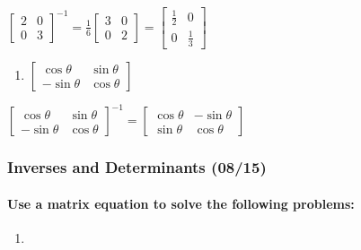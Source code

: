 \documentclass[
  letterpaper,
  DIV=11,
  numbers=noendperiod]{scrartcl}
\let\oldparagraph\paragraph
\renewcommand{\paragraph}[1]{\oldparagraph{#1}\mbox{}}
\providecommand{\tightlist}{%
  \setlength{\itemsep}{0pt}\setlength{\parskip}{0pt}}\usepackage{longtable,booktabs,array}
\begin{document}
\(\begin{bmatrix}2 & 0 \\ 0 & 3 \end{bmatrix}^{-1} = \frac{1}{6}\begin{bmatrix}3 & 0 \\ 0 & 2 \end{bmatrix}=\begin{bmatrix}\frac{1}{2} & 0 \\ 0 & \frac{1}{3}\end{bmatrix}\)

\begin{enumerate}
\def\labelenumi{\arabic{enumi})}
\setcounter{enumi}{2}
\tightlist
\item
  \(\begin{bmatrix}\cos\theta & \sin\theta \\ -\sin\theta & \cos\theta \end{bmatrix}\)
\end{enumerate}

\(\begin{bmatrix}\cos\theta & \sin\theta \\ -\sin\theta & \cos\theta \end{bmatrix}^{-1} = \begin{bmatrix}\cos\theta & -\sin\theta \\ \sin\theta & \cos\theta \end{bmatrix}\)

\subsubsection{Inverses and Determinants
(08/15)}\label{inverses-and-determinants-0815}

\paragraph{Use a matrix equation to solve the following
problems:}\label{use-a-matrix-equation-to-solve-the-following-problems}

\begin{enumerate}
\def\labelenumi{\arabic{enumi})}
\item
\end{enumerate}
\end{document}
